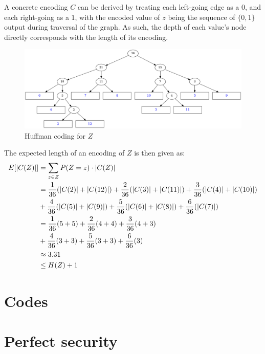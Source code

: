 \documentclass[a4paper]{scrreprt}
\DeclarePairedDelimiter\abs{\lvert}{\rvert}
\begin{document}
A concrete encoding $C$ can be derived by treating each left-going edge as a $0$,
and each right-going as a $1$, with the encoded value of $z$ being the sequence
of $\{0, 1\}$ output during traversal of the graph. As such, the depth of each
value's node directly corresponds with the length of its encoding.

\begin{figure}
	\centering
	\includegraphics[width=\linewidth]{graphs/huffman_1.png}
	\caption{Huffman coding for $Z$}
	\label{fig:huffman_coding}
\end{figure}

The expected length of an encoding of $Z$ is then given as:
\begin{align*}
	E[\abs{C(Z)}] & = \sum_{z \in Z}{P(Z = z) \cdot \abs{C(Z)}} \\
	& = \frac{1}{36} (\abs{C(2)} + \abs{C(12)}) 
	+ \frac{2}{36} (\abs{C(3)} + \abs{C(11)}) 
	+ \frac{3}{36} (\abs{C(4)} + \abs{C(10)}) \\
	& + \frac{4}{36} (\abs{C(5)} + \abs{C(9)})
	+ \frac{5}{36} (\abs{C(6)} + \abs{C(8)})
	+ \frac{6}{36} (\abs{C(7)}) \\
	& = \frac{1}{36} (5 + 5)
	+ \frac{2}{36} (4 + 4)
	+ \frac{3}{36} (4 + 3) \\
	& + \frac{4}{36} (3 + 3)
	+ \frac{5}{36} (3 + 3)
	+ \frac{6}{36} (3) \\
	& \approx 3.31 \\
	& \leq H(Z) + 1
\end{align*}

\section{Codes}

\section{Perfect security}
\end{document}
